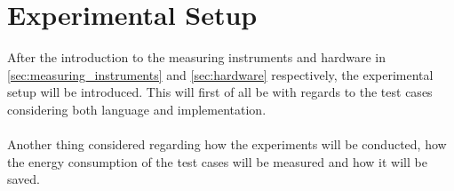 \section{Experimental Setup}\label{sec:experimental_setup}

After the introduction to the measuring instruments and hardware in \cref{sec:measuring_instruments} and \cref{sec:hardware} respectively, the experimental setup will be introduced. This will first of all be with regards to the test cases considering both language and implementation.

\paragraph*{}
Another thing considered regarding how the experiments will be conducted, how the energy consumption of the test cases will be measured and how it will be saved. 





